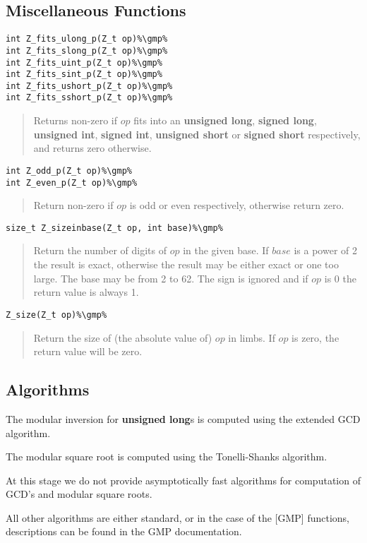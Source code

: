 \documentclass[a4paper,10pt]{article}
\newcommand{\gmp}{\hfill[GMP]}
\begin{document}
\subsection{Miscellaneous Functions}
\begin{lstlisting}
int Z_fits_ulong_p(Z_t op)%\gmp%
int Z_fits_slong_p(Z_t op)%\gmp%
int Z_fits_uint_p(Z_t op)%\gmp%
int Z_fits_sint_p(Z_t op)%\gmp%
int Z_fits_ushort_p(Z_t op)%\gmp%
int Z_fits_sshort_p(Z_t op)%\gmp%
\end{lstlisting}
\begin{quote}Returns non-zero if $op$ fits into an \textbf{unsigned long}, \textbf{signed long}, \textbf{unsigned int}, \textbf{signed int}, \textbf{unsigned short} or \textbf{signed short} respectively, and returns zero otherwise.\end{quote}

\begin{lstlisting}
int Z_odd_p(Z_t op)%\gmp%
int Z_even_p(Z_t op)%\gmp%
\end{lstlisting}
\begin{quote}Return non-zero if $op$ is odd or even respectively, otherwise return zero.\end{quote}

\begin{lstlisting}
size_t Z_sizeinbase(Z_t op, int base)%\gmp%
\end{lstlisting}
\begin{quote}Return the number of digits of $op$ in the given base. If $base$ is a power of 2 the result is exact, otherwise the result may be either exact or one too large. The base may be from 2 to 62. The sign is ignored and if $op$ is 0 the return value is always 1.\end{quote}

\begin{lstlisting}
Z_size(Z_t op)%\gmp%
\end{lstlisting}
\begin{quote}Return the size of (the absolute value of) $op$ in limbs. If $op$ is zero, the return value will be zero.\end{quote}

\subsection{Algorithms}
The modular inversion for \textbf{unsigned long}s is computed using the extended GCD algorithm.

The modular square root is computed using the Tonelli-Shanks algorithm.

At this stage we do not provide asymptotically fast algorithms for computation of GCD's and modular square roots.

All other algorithms are either standard, or in the case of the [GMP] functions, descriptions can be found in the GMP documentation.
\end{document}
